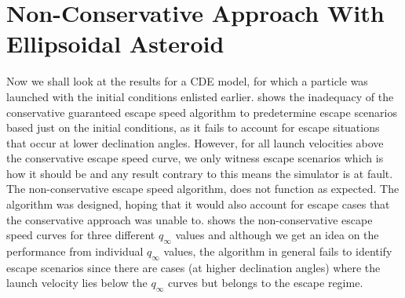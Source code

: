 \section{Non-Conservative Approach With Ellipsoidal Asteroid}
\label{sec:nonconservative_escape_cde_results}
Now we shall look at the results for a \gls{CDE} model, for which a particle was launched with the initial conditions enlisted earlier.  shows the inadequacy of the conservative guaranteed escape speed algorithm to predetermine escape scenarios based just on the initial conditions, as it fails to account for escape situations that occur at lower declination angles. However, for all launch velocities above the conservative escape speed curve, we only witness escape scenarios which is how it should be and any result contrary to this means the simulator is at fault. The non-conservative escape speed algorithm, does not function as expected. The algorithm was designed, hoping that it would also account for escape cases that the conservative approach was unable to.  shows the non-conservative escape speed curves for three different $q_\infty$ values and although we get an idea on the performance from individual $q_\infty$ values, the algorithm in general fails to identify escape scenarios since there are cases (at higher declination angles) where the launch velocity lies below the $q_\infty$ curves but belongs to the escape regime.
